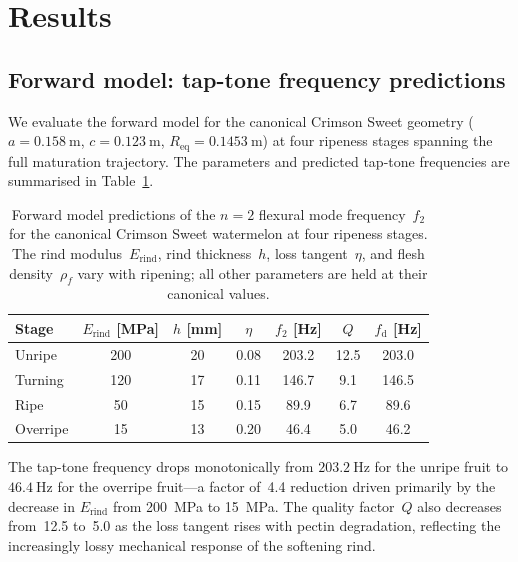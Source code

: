 \section{Results}
\label{sec:results}

\subsection{Forward model: tap-tone frequency predictions}
\label{sec:forward}

We evaluate the forward model for the canonical Crimson Sweet geometry
($a = \SI{0.158}{\metre}$, $c = \SI{0.123}{\metre}$,
$R_{\mathrm{eq}} = \SI{0.1453}{\metre}$) at four ripeness stages
spanning the full maturation trajectory.  The parameters and predicted
tap-tone frequencies are summarised in Table~\ref{tab:forward_results}.

\begin{table}[t]
  \centering
  \caption{Forward model predictions of the $n = 2$ flexural mode
    frequency~$f_2$ for the canonical Crimson Sweet watermelon at four
    ripeness stages.  The rind modulus~$E_{\mathrm{rind}}$, rind
    thickness~$h$, loss tangent~$\eta$, and flesh density~$\rho_f$ vary
    with ripening; all other parameters are held at their canonical values.}
  \label{tab:forward_results}
  \begin{tabular}{lcccccc}
    \toprule
    Stage & $E_{\mathrm{rind}}$ [MPa] & $h$ [mm] & $\eta$ &
      $f_2$ [Hz] & $Q$ & $f_{\mathrm{d}}$ [Hz] \\
    \midrule
    Unripe   & 200 & 20 & 0.08 & 203.2 & 12.5 & 203.0 \\
    Turning  & 120 & 17 & 0.11 & 146.7 &  9.1 & 146.5 \\
    Ripe     &  50 & 15 & 0.15 &  89.9 &  6.7 &  89.6 \\
    Overripe &  15 & 13 & 0.20 &  46.4 &  5.0 &  46.2 \\
    \bottomrule
  \end{tabular}
\end{table}

The tap-tone frequency drops monotonically from $\SI{203.2}{\hertz}$ for
the unripe fruit to $\SI{46.4}{\hertz}$ for the overripe fruit---a
factor of~4.4 reduction driven primarily by the decrease in
$E_{\mathrm{rind}}$ from \SI{200}{\mega\pascal} to
\SI{15}{\mega\pascal}.  The quality factor~$Q$ also decreases from~12.5
to~5.0 as the loss tangent rises with pectin degradation, reflecting the
increasingly lossy mechanical response of the softening rind.

